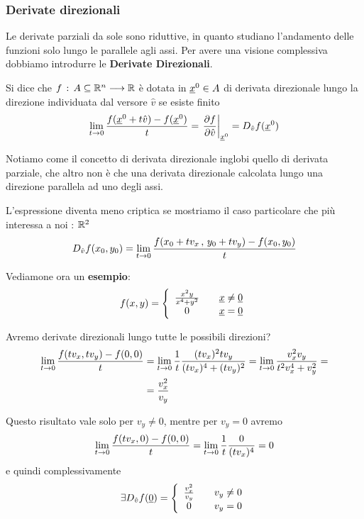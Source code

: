 \subsubsection{Derivate direzionali}

Le derivate parziali da sole sono riduttive, in quanto studiano l'andamento delle funzioni solo lungo le parallele agli assi. Per avere una visione complessiva dobbiamo introdurre le \textbf{Derivate Direzionali}.

\smallskip

Si dice che $f \, : \, A \subseteq\mathbb{R}^n \longrightarrow \mathbb{R}$ è dotata in $\underline{x}^0 \in A$ di derivata direzionale lungo la direzione individuata dal versore $\hat{v}$ se esiste finito
\begin{align}
\underset{t \rightarrow 0}{\lim} \,\frac{f(\underline{x}^0 + t \hat{v}) - f(\underline{x}^0)}{t}= \left. \frac{\partial f}{\partial \hat{v}} \right|_{\underline{x}^0} = D_{\hat{v}}f(\underline{x}^0)
\end{align}

Notiamo come il concetto di derivata direzionale inglobi quello di derivata parziale, che altro non è che una derivata direzionale calcolata lungo una direzione parallela ad uno degli assi.

L'espressione diventa meno criptica se mostriamo il caso particolare che più interessa a noi : $\mathbb{R}^2$
\begin{align}
D_{\hat{v}}f(x_0,y_0)=\underset{t \rightarrow 0}{\lim} \,\frac{f(x_0 + t v_x\, , \, y_0 + t v_y)-f(x_0,y_0)}{t}
\end{align}

Vediamone ora un \textbf{esempio}:
\begin{align}
f(x,y)=\left\{\begin{array}{cc} \frac{x^2 y}{x^4 + y^2} \quad {}& \underline{x} \neq \underline{0} \\ 0 \quad &\underline{x} = \underline{0} \end{array}\right.
\end{align}

Avremo derivate direzionali lungo tutte le possibili direzioni?
\begin{align}
\underset{t \rightarrow 0}{\lim} \, \frac{f(tv_x,tv_y) - f(0,0)}{t} {}&=\underset{t \rightarrow 0}{\lim} \,\frac{1}{t}\frac{(tv_x)^2 tv_y}{(t v_x)^4 + (tv_y)^2}= \underset{t \rightarrow 0}{\lim} \, \frac{v_x^2 v_y}{t^2 v_x^4 + v_y^2} = \nonumber \\
&= \frac{v_x^2}{v_y}
\end{align}

Questo risultato vale solo per $v_y \neq 0$, mentre per $v_y = 0$ avremo
\begin{align}
\underset{t \rightarrow 0}{\lim} \, \frac{f(tv_x,0) - f(0,0)}{t}= \underset{t \rightarrow 0}{\lim} \, \frac{1}{t} \frac{0}{(tv_x)^4}=0
\end{align}
e quindi complessivamente
\begin{align}
\exists D_{\hat v} f(\underline{0})= \left\{\begin{array}{cc} \frac{v_x^2}{v_y} \quad {}&v_y \neq 0 \\ 0 \quad &v_y=0 \end{array}\right.
\end{align}

